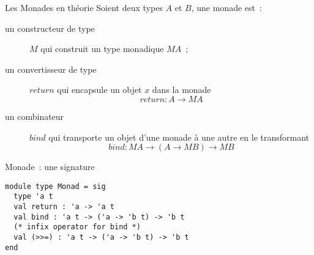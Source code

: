 \documentclass[10pt]{beamer}
\begin{document}
\begin{frame}{Les Monades en théorie}
  Soient deux types $A$ et $B$, une monade est~:
  \begin{description}
  \item[un constructeur de type] $M$ qui construit un type monadique
    $M A$~;
  \item[un convertisseur de type]
    $return$ qui encapsule un objet $x$ dans la monade
    \[ return : A \to M A \]
  \item[un combinateur] $bind$ qui transporte un objet d'une monade à
    une autre en le transformant
    \[ bind : M A \to (A \to M B) \to M B \]
  \end{description}
\end{frame}

\begin{frame}[fragile]{Monade~: une signature}
  \begin{verbatim}
module type Monad = sig
  type 'a t
  val return : 'a -> 'a t
  val bind : 'a t -> ('a -> 'b t) -> 'b t
  (* infix operator for bind *)
  val (>>=) : 'a t -> ('a -> 'b t) -> 'b t
end
  \end{verbatim}
\end{frame}
\end{document}
